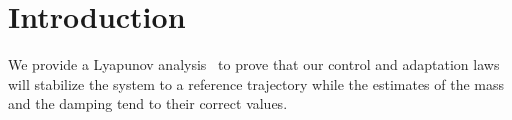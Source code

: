 \section{Introduction}
\label{sec:intro}

We provide a Lyapunov analysis~\cite{khalil2015nonlinear} to prove that our
control and adaptation laws will stabilize the system to a reference trajectory
while the estimates of the mass and the damping tend to their correct values.
